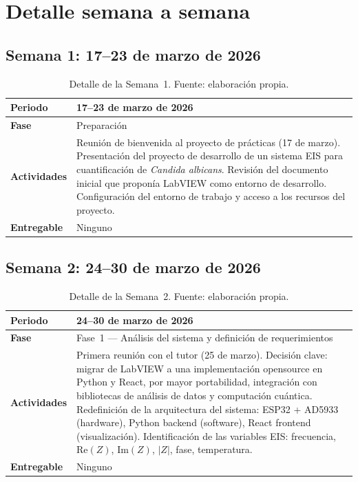 \documentclass[11pt,a4paper,spanish]{book}
\begin{document}
\section{Detalle semana a semana}

\subsection{Semana 1: 17--23 de marzo de 2026}

\begin{table}[ht]
\centering
\begin{tabular}{p{3cm} p{10cm}}
\hline\hline
\textbf{Periodo} & 17--23 de marzo de 2026 \\ [0.5ex]
\hline
\textbf{Fase} & Preparaci\'{o}n \\ \hline
\textbf{Actividades} & Reuni\'{o}n de bienvenida al proyecto de pr\'{a}cticas (17 de marzo). Presentaci\'{o}n del proyecto de desarrollo de un sistema EIS para cuantificaci\'{o}n de \textit{Candida albicans}. Revisi\'{o}n del documento inicial que propon\'{i}a LabVIEW como entorno de desarrollo. Configuraci\'{o}n del entorno de trabajo y acceso a los recursos del proyecto. \\ \hline
\textbf{Entregable} & Ninguno \\ \hline
\end{tabular}
\caption[Semana 1]{Detalle de la Semana~1. Fuente: elaboraci\'{o}n propia.}
\label{tab:semana1}
\end{table}

\subsection{Semana 2: 24--30 de marzo de 2026}

\begin{table}[ht]
\centering
\begin{tabular}{p{3cm} p{10cm}}
\hline\hline
\textbf{Periodo} & 24--30 de marzo de 2026 \\ [0.5ex]
\hline
\textbf{Fase} & Fase~1 --- An\'{a}lisis del sistema y definici\'{o}n de requerimientos \\ \hline
\textbf{Actividades} & Primera reuni\'{o}n con el tutor (25 de marzo). Decisi\'{o}n clave: migrar de LabVIEW a una implementaci\'{o}n opensource en Python y React, por mayor portabilidad, integraci\'{o}n con bibliotecas de an\'{a}lisis de datos y computaci\'{o}n cu\'{a}ntica. Redefinici\'{o}n de la arquitectura del sistema: ESP32 + AD5933 (hardware), Python backend (software), React frontend (visualizaci\'{o}n). Identificaci\'{o}n de las variables EIS: frecuencia, $\mathrm{Re}(Z)$, $\mathrm{Im}(Z)$, $|Z|$, fase, temperatura. \\ \hline
\textbf{Entregable} & Ninguno \\ \hline
\end{tabular}
\caption[Semana 2]{Detalle de la Semana~2. Fuente: elaboraci\'{o}n propia.}
\label{tab:semana2}
\end{table}
\end{document}
